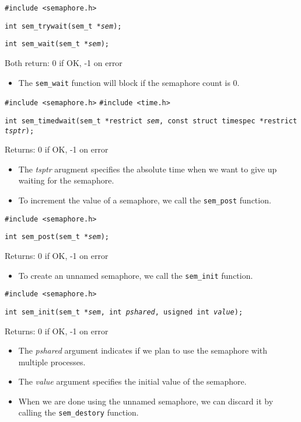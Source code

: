 \documentclass[]{article}
\newcommand{\code}{\texttt}
\begin{document}
\code{\#include <semaphore.h>}

\code{int sem\_trywait(sem\_t *\emph{sem});}

\code{int sem\_wait(sem\_t *\emph{sem});}

Both return: 0 if OK, -1 on error

\begin{itemize}
\item The \code{sem\_wait} function will block if the semaphore count is 0.
\end{itemize}

\code{\#include <semaphore.h>}
\code{\#include <time.h>}

\code{int sem\_timedwait(sem\_t *restrict \emph{sem}, const struct timespec
*restrict \emph{tsptr});}

Returns: 0 if OK, -1 on error

\begin{itemize}
\item The \emph{tsptr} arugment specifies the absolute time when we want to give
up waiting for the semaphore.
\item To increment the value of a semaphore, we call the \code{sem\_post}
function.
\end{itemize}

\code{\#include <semaphore.h>}

\code{int sem\_post(sem\_t *\emph{sem});}

Returns: 0 if OK, -1 on error

\begin{itemize}
\item To create an unnamed semaphore, we call the \code{sem\_init} function.
\end{itemize}

\code{\#include <semaphore.h>}

\code{int sem\_init(sem\_t *\emph{sem}, int \emph{pshared}, usigned int
\emph{value});}

Returns: 0 if OK, -1 on error

\begin{itemize}
\item The \emph{pshared} argument indicates if we plan to use the semaphore with
multiple processes.
\item The \emph{value} argument specifies the initial value of the semaphore.
\item When we are done using the unnamed semaphore, we can discard it by calling
the \code{sem\_destory} function.
\end{itemize}
\end{document}
